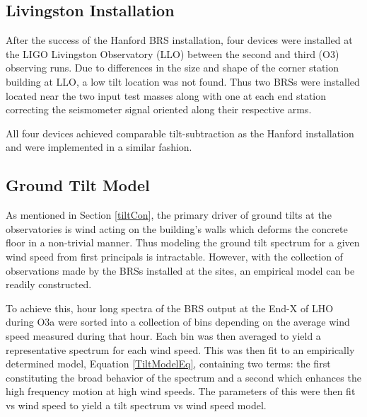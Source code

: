 \documentclass [12pt, proquest]{uwthesis}[2019]
\begin{document}
\subsection{Livingston Installation}

\quad After the success of the Hanford BRS installation, four devices were installed at the LIGO Livingston Observatory (LLO) between the second and third (O3) observing runs. Due to differences in the size and shape of the corner station building at LLO, a low tilt location was not found. Thus two BRSs were installed located near the two input test masses along with one at each end station correcting the seismometer signal oriented along their respective arms. 

All four devices achieved comparable tilt-subtraction as the Hanford installation and were implemented in a similar fashion. 

\subsection{Ground Tilt Model}


As mentioned in Section \ref{tiltCon}, the primary driver of ground tilts at the observatories is wind acting on the building's walls which deforms the concrete floor in a non-trivial manner. Thus modeling the ground tilt spectrum for a given wind speed from first principals is intractable. However, with the collection of observations made by the BRSs installed at the sites, an empirical model can be readily constructed.

To achieve this, hour long spectra of the BRS output at the End-X of LHO during O3a were sorted into a collection of bins depending on the average wind speed measured during that hour. Each bin was then averaged to yield a representative spectrum for each wind speed. This was then fit to an empirically determined model, Equation \ref{TiltModelEq}, containing two terms: the first constituting the broad behavior of the spectrum and a second which enhances the high frequency motion at high wind speeds. The parameters of this were then fit vs wind speed to yield a tilt spectrum vs wind speed model. 
\end{document}
